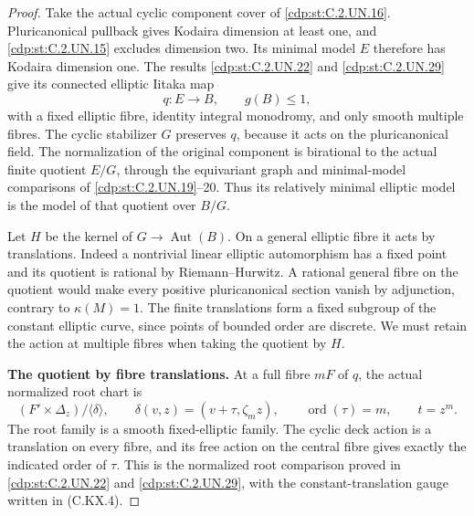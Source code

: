 \begin{proof}
Take the actual cyclic component cover of \ref{cdp:st:C.2.UN.16}.
Pluricanonical pullback gives Kodaira dimension at least
one, and \ref{cdp:st:C.2.UN.15} excludes dimension two. Its minimal model
$E$ therefore has Kodaira dimension one. The results
\ref{cdp:st:C.2.UN.22} and \ref{cdp:st:C.2.UN.29} give its connected elliptic Iitaka map
\[
 q:E\longrightarrow B,\qquad g(B)\le1,                 \tag{C.EQ.2}\label{cdp:eq:C.EQ.2}
\]
with a fixed elliptic fibre, identity integral monodromy,
and only smooth multiple fibres. The cyclic stabilizer
$G$ preserves $q$, because it acts on the pluricanonical
field. The normalization of the original component is
birational to the actual finite quotient $E/G$, through
the equivariant graph and minimal-model comparisons of
\ref{cdp:st:C.2.UN.19}--20. Thus its relatively minimal elliptic model is
the model of that quotient over $B/G$.

Let $H$ be the kernel of $G\to\operatorname{Aut}(B)$.
On a general elliptic fibre it acts by translations.
Indeed a nontrivial linear elliptic automorphism has a
fixed point and its quotient is rational by
Riemann--Hurwitz. A rational general fibre on the
quotient would make every positive pluricanonical
section vanish by adjunction, contrary to $\kappa(M)=1$.
The finite translations form a fixed subgroup of the
constant elliptic curve, since points of bounded order
are discrete. We must retain the action at multiple
fibres when taking the quotient by $H$.

\par\medskip\noindent\textbf{The quotient by fibre translations.}
At a full fibre $mF$ of $q$, the actual normalized root
chart is
\[
 (F'\times\Delta_z)/\langle\delta\rangle,
 \qquad \delta(v,z)=(v+\tau,\zeta_m z),
 \qquad \operatorname{ord}(\tau)=m,
 \qquad t=z^m.                                        \tag{C.EQ.3}\label{cdp:eq:C.EQ.3}
\]
The root family is a smooth fixed-elliptic family.
The cyclic deck action is a translation on every fibre,
and its free action on the central fibre gives exactly
the indicated order of $\tau$. This is the normalized
root comparison proved in \ref{cdp:st:C.2.UN.22} and \ref{cdp:st:C.2.UN.29}, with the
constant-translation gauge written in (C.KX.4).


\end{proof}
